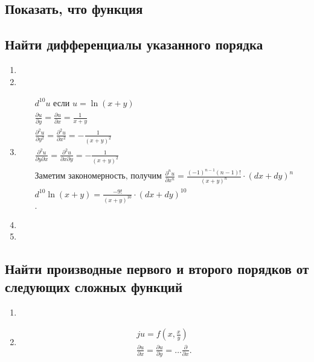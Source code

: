 \subsection{Показать, что функция}
\subsection{Найти дифференциалы указанного порядка}
\begin{enumerate}
  \item %
  \item %
  \item %
    \begin{align*}
      d^{10}u \text { если } u = \ln(x+y) \\
      \frac{\partial u}{\partial y} = \frac{\partial u}{\partial x} = \frac{1}{x+y} \\
      \frac{\partial^2 u}{\partial y^2} = \frac{\partial^2 u}{\partial x^2} = -\frac{1}{(x+y)^2} \\
      \frac{\partial^2 u}{\partial y \partial x} = \frac{\partial^2 u}{\partial x \partial y} = -\frac{1}{(x+y)^2} \\
      \text{Заметим закономерность, получим } \frac{\partial^n u}{\partial x^n} =
      \frac{(-1)^{n-1} (n-1)!}{(x+y)^n}\cdot (dx+dy)^{n} \\
      d^{10}\ln(x+y) = \frac{- 9!}{(x+y)^{10}}\cdot (dx+dy)^{10} \\
    .\end{align*}
  \item %
  \item %
\end{enumerate}
\subsection{Найти производные первого и второго порядков от следующих сложных функций}
\begin{enumerate}
  \item %
  \item %
    \begin{align*}j
      u = f\left( x, \frac{x}{y} \right) \\
      \frac{\partial u}{\partial x} = 
      \frac{\partial u}{\partial y} = \ldots 
      \frac{\partial }{\partial x} 
    .\end{align*}
\end{enumerate}
